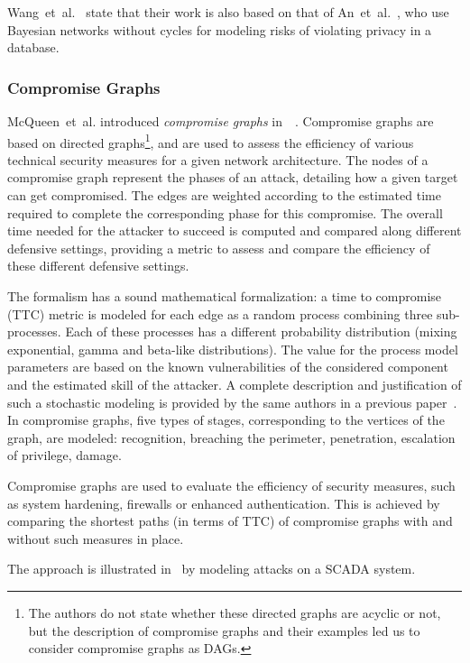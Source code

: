 \documentclass[a4paper]{article}
\begin{document}
Wang~et~al.~\cite{FrWa,FrWaSiJa} state that their work is also based on that
of An~et~al.~\cite{AnJuCe}, who use Bayesian networks without cycles for
modeling risks of violating privacy in a database.

\subsubsection{Compromise Graphs} 
\label{sec:compormise_graphs}

McQueen~et~al. introduced \emph{compromise graphs} in~~\cite{QuBoFlBe}.
Compromise graphs are based on directed graphs\footnote{The authors do not state
whether these directed graphs are acyclic or not, but the description of
compromise graphs and their examples led us to consider compromise graphs as
DAGs.}, and are used to assess the efficiency of various technical
security measures for a given network architecture. The nodes of a compromise
graph represent the phases of an attack, detailing how a given target can get
compromised. The edges are weighted according to the estimated
time required to complete the corresponding phase for this compromise.
The overall time needed for the attacker to succeed is computed and compared
along different defensive settings, providing a metric to assess and compare
the efficiency of these different defensive settings.

The formalism has a sound mathematical formalization: a time to compromise (TTC)
metric is modeled for each edge as a random process combining three
sub-processes. Each of these processes has a different probability distribution
(mixing exponential, gamma and beta-like distributions). The value for the
process model parameters are based on the known vulnerabilities of the
considered component and the estimated skill of the attacker. A complete
description and justification of such a stochastic modeling is provided by the
same authors in a previous paper~\cite{McQueen2005}. In compromise graphs, five
types of stages, corresponding to the vertices of the graph, are modeled:
recognition, breaching the perimeter, penetration, escalation of privilege,
damage.

Compromise graphs are used to evaluate the efficiency of security measures, 
such as system hardening, firewalls or enhanced authentication. This is achieved
by comparing the shortest paths (in terms of TTC) of compromise graphs with and
without such measures in place. 

The approach is illustrated in~\cite{QuBoFlBe} by modeling attacks on a
SCADA system.
\end{document}

